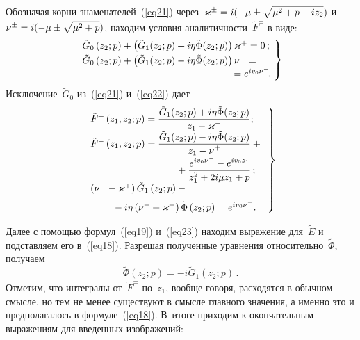 \begin{multicols}{2}
Обозначая корни знаменателей~(\ref{eq21}) через~$\varkappa^\pm \hm= i( -\mu  \pm \sqrt{ \mu ^2 +p - i z_2})$ и~$\nu^\pm\hm= i( -\mu  \pm \sqrt{ \mu ^2 + p})$, находим условия аналитичности~$\tilde F^\pm$ в виде:
\begin{equation}
\left.
  \begin{array}{l}
\hspace*{-2mm}\tilde G_0\left(z_2; p\right) + \left(\tilde G_1(z_2; p)+i\eta \tilde \Phi(z_2; p)\right)    \varkappa^+ = 0\,;\\[3pt]
\hspace*{-2mm}\tilde G_0\left(z_2; p\right) + \left(\tilde G_1(z_2; p)-i\eta \tilde \Phi(z_2; p)\right)\nu^- = {}\\
\hspace*{52mm}{}= e^{i v_0 \nu^-}\!.
  \end{array}\!
  \right\}\!\!
    \label{eq22}
\end{equation}
Исключение~$\tilde G_0$ из~(\ref{eq21}) и~(\ref{eq22}) дает
\begin{equation}
\left.
  \begin{array}{l}
   \tilde F^+\left(z_1,z_2; p\right) = \fr{\tilde G_1(z_2; p)+i\eta \tilde \Phi(z_2; p)}{z_1-\varkappa^-};\\[6pt]
\tilde F^-\left(z_1,z_2; p\right) = \fr{\tilde G_1(z_2; p)-i\eta \tilde \Phi(z_2; p)}{z_1-\nu^+} + {}\\[6pt]
   \hspace*{31mm}{}+\fr{e^{i v_0 \nu^-} - e^{i v_0 z_1}}{z_1^2 +2i \mu   z_1 + p}\,;\\[6pt]
\left(\nu^- - \varkappa^+\right)\tilde G_1\left(z_2; p\right) - {}\\[6pt]
\hspace*{8mm}{}-i \eta \left(\nu^- + \varkappa^+\right) \tilde \Phi\left(z_2; p\right)= e^{i v_0 \nu^-}.
  \end{array}
\right\}
    \label{eq23}
\end{equation}

Далее с помощью формул~(\ref{eq19}) и~(\ref{eq23}) находим выражение для~$\tilde E$ и подставляем его в~(\ref{eq18}). Разрешая полученные уравнения относительно~$\tilde \Phi$, получаем
\begin{equation*}
  \tilde \Phi\left(z_2;p\right) = -i \tilde G_1\left(z_2;p\right)\,.
\end{equation*}
Отметим, что интегралы от~$\tilde F^\pm$ по~$z_1$, вообще говоря, расходятся в обычном смысле, но тем не менее существуют в смысле главного значения, а именно это и предполагалось в формуле~(\ref{eq18}). В~итоге приходим к окончательным выражениям для введенных изображений:


\end{multicols}
